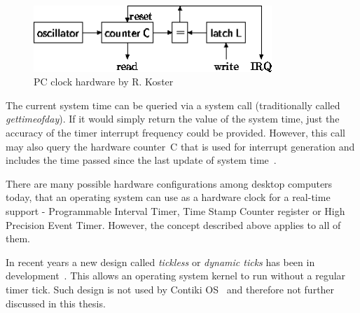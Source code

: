 \begin{figure}
  \centering
  \includegraphics[width=9cm,keepaspectratio]{fig/pc-clock.png}
  \caption{PC clock hardware by R. Koster}
  \label{fig:system-pc-clock}
\end{figure}

The current system time can be queried via a system call
(traditionally called {\it{gettimeofday}}).
If it would simply return the value of the system time,
just the accuracy of the timer interrupt frequency could be provided.
However, this call may also query the hardware counter~C that is used for
interrupt generation and includes the time passed since
the last update of system time~\cite{thesis-beat}.

There are many possible hardware configurations among desktop computers today,
that an operating system can use as a hardware clock for a real-time support -
Programmable Interval Timer,
Time Stamp Counter register or High Precision Event Timer.
However, the concept described above applies to all of them.

In recent years a new design called {\it{tickless}} or {\it{dynamic ticks}}
has been in development~\cite{kernel-timer-systems}.
This allows an operating system kernel to run without a regular timer tick.
Such design is not used by Contiki OS~\cite{contiki-docs} and
therefore not further discussed in this thesis.

